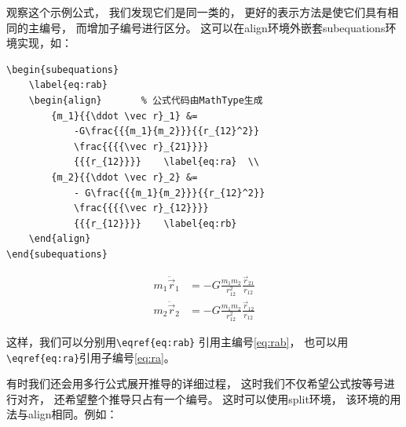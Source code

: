 \documentclass{ctexart}
\numberwithin{equation}{section}			%
\begin{document}
	观察这个示例公式，
	我们发现它们是同一类的，
	更好的表示方法是使它们具有相同的主编号，
	而增加子编号进行区分。
	这可以在align环境外嵌套subequations环境实现，如：
	
\begin{lstlisting}
\begin{subequations}
	\label{eq:rab}
	\begin{align}		% 公式代码由MathType生成
		{m_1}{{\ddot \vec r}_1} &=  
			-G\frac{{{m_1}{m_2}}}{{r_{12}^2}}
			\frac{{{{\vec r}_{21}}}}
			{{{r_{12}}}} 	\label{eq:ra}  \\
		{m_2}{{\ddot \vec r}_2} &=  
			- G\frac{{{m_1}{m_2}}}{{r_{12}^2}}
			\frac{{{{\vec r}_{12}}}}
			{{{r_{12}}}} 	\label{eq:rb}
	\end{align} 
\end{subequations}
\end{lstlisting}
	\begin{subequations}
		\label{eq:rab}
		\begin{align}		%
			{m_1}{{\ddot \vec r}_1} &=  
				-G\frac{{{m_1}{m_2}}}{{r_{12}^2}}
				\frac{{{{\vec r}_{21}}}}
				{{{r_{12}}}} 	\label{eq:ra}  \\
			{m_2}{{\ddot \vec r}_2} &=  
				- G\frac{{{m_1}{m_2}}}{{r_{12}^2}}
				\frac{{{{\vec r}_{12}}}}
				{{{r_{12}}}} 	\label{eq:rb}
		\end{align} 
	\end{subequations}

	这样，我们可以分别用\verb|\eqref{eq:rab}|
	引用主编号\eqref{eq:rab}，
	也可以用\verb|\eqref{eq:ra}|引用子编号\eqref{eq:ra}。
	
	有时我们还会用多行公式展开推导的详细过程，
	这时我们不仅希望公式按等号进行对齐，
	还希望整个推导只占有一个编号。
	这时可以使用split环境，
	该环境的用法与align相同。例如：
	
\end{document}
